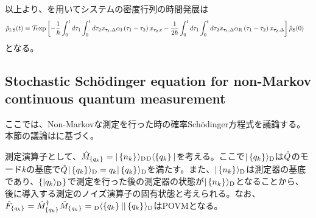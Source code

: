 \documentclass[10pt, a4paper]{jsarticle}
\begin{document}
以上より、を用いてシステムの密度行列の時間発展は
\begin{equation}
\begin{split}
\label{eq:211}
	\hrho{I,S}(t) &= \sop{T}{} \exp{- \dfrac{1}{\hbar} \integ{0}{t} d\tau_{1} \integ{0}{t} d\tau_{2}  x_{\tau_{1}, \Delta} \alpha_{\rm I} \left(\tau_{1} - \tau_{2} \right) x_{\tau_{2}, {\rm c}} - \dfrac{1}{2 \hbar} \integ{0}{t} d\tau_{1} \integ{0}{t} d\tau_{2}  x_{\tau_{1}, \Delta} \alpha_{\rm R} \left(\tau_{1} - \tau_{2} \right) x_{\tau_{2}, \Delta}} \hrho{S}(0)
\end{split}
\end{equation}
となる。


\subsection{Stochastic Sch\"{o}dinger equation for non-Markov continuous quantum measurement}
\label{sec:23}

ここでは、Non-Markovな測定を行った時の確率Sch\"{o}dinger方程式を議論する。本節の議論は\cite{gambetta2002non-markov}に基づく。

測定演算子として、$\op{M}{\set{q_{k}}{}} = \ket{\set{n_{k}}{}}{D} \bra{\set{q_{k}}{}}{D}$を考える。ここで$\ket{\set{q_{k}}{}}{D}$は$\op{Q}{}$のモード$k$の基底で$\op{Q}{} \ket{\set{q_{k}}{}}{D} = q_{k} \ket{\set{q_{k}}{}}{D}$を満たす。また、$\ket{\set{n_{k}}{}}{D}$は測定器の基底であり、$\basis{q_{k}}{D}{}$で測定を行った後の測定器の状態が$\ket{\set{n_{k}}{}}{D}$となることから、後に導入する測定のノイズ演算子の固有状態と考えられる。なお、$\op{F}{\set{q_{k}}{}} = \op{M}{\set{q_{k}}{}}^{\dagger} \op{M}{\set{q_{k}}{}} = \bra{\set{q_{k}}{}}{D} \ket{\set{q_{k}}{}}{D}$はPOVMとなる。
\end{document}

